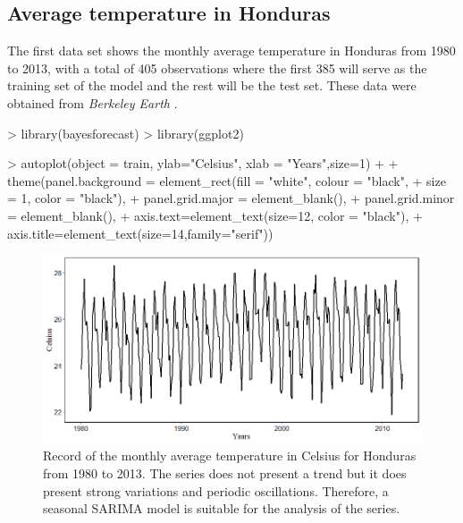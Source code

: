 \subsection{Average temperature in Honduras}
The first data set shows the monthly average temperature in Honduras from 1980 to 2013, with a total of 405 observations where the first 385 will serve as the training set of the model and the rest will be the test set. These data were obtained from \textit{Berkeley Earth} \cite{berkeley}.
%
\begin{example*}
> library(bayesforecast)
> library(ggplot2)	

> autoplot(object = train, ylab="Celsius", xlab = "Years",size=1) +
+     theme(panel.background = element_rect(fill = "white", colour = "black",
+                                           size = 1, color = "black"),
+           panel.grid.major = element_blank(),
+           panel.grid.minor = element_blank(),
+           axis.text=element_text(size=12, color = "black"),
+           axis.title=element_text(size=14,family="serif"))
\end{example*}	
%
\begin{figure}[!ht]
	\centering
	\includegraphics[scale=0.5]{Figs/11}
	\caption{Record of the monthly average temperature in Celsius for Honduras from 1980 to 2013. The series does not present a trend but it does present strong variations and periodic oscillations. Therefore, a seasonal SARIMA model is suitable for the analysis of the series.} \label{fig:temperatura}
\end{figure}
%	

